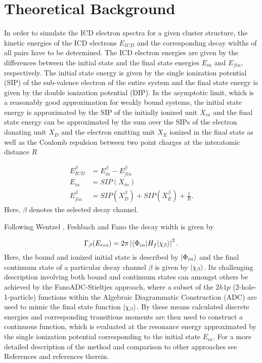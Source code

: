 \section{Theoretical Background}
\label{sec:theory}

In order to simulate the ICD electron spectra for a given cluster structure,
the kinetic energies of the ICD electrons $E_{ICD}$ and the corresponding
decay widths of all pairs have to be determined. The ICD electron energies
are given by the differences between the initial state and the final state
energies $E_{in}$ and $E_{fin}$, respectively. The initial state energy
is given by the single ionization potential (SIP) of the sub-valence electron
of the entire system
and the final state energy is given by the double ionization potential (DIP).
In the asymptotic limit, which is a reasonably good approximation for
weakly bound systems, the initial state energy is approximated by the SIP
of the initially ionized unit $X_{in}$ and the final state energy can be
approximated
by the sum over the SIPs of the electron donating unit $X_D$ and the electron
emitting unit $X_E$ ionized in the final state as well as the
Coulomb repulsion between two point charges at the interatomic distance $R$

\begin{eqnarray}
 E_{ICD}^\beta &= E_{in}^\beta - E_{fin}^\beta \label{equation:E_sec}\\
 E_{in}        &= SIP(X_{in}) \label{equation:E_in}\\          
 E_{fin}^\beta &= SIP(X_{D}^\beta) + SIP(X_{E}^\beta) + \frac 1R
           \label{equation:E_fin}                . 
\end{eqnarray}
Here, $\beta$ denotes the selected decay channel.

Following Wentzel \cite{Wentzel27}, Feshbach\cite{Feshbach58,Feshbach62}
and Fano \cite{Fano61} the decay width is given by

\begin{equation}
 \Gamma_{\beta}(E_{res}) = 2\pi \left|
                           \braket{\Phi_{in}| H_f |\chi_{\beta}}
                           \right|^2   .
\end{equation}
Here, the bound and ionized initial state is described by $\ket{\Phi_{in}}$ and
the final continuum state of a particular decay channel $\beta$ is
given by $\ket{\chi_{\beta}}$.
Its challenging description involving both bound and continuum states can
amongst others be achieved by the FanoADC-Stieltjes approach, where a
subset of the  $2h1p$ (2-hole-1-particle) functions within the
Algebraic Diagrammatic Construction
(ADC) are used to mimic the final state function $\ket{\chi_{\beta}}$.
By these means calculated discrete energies and corresponding transitions
moments are then used to construct a continuous function, which is evaluated
at the resonance energy approximated by the single ionization potential
corresponding to the initial state $E_{in}$. For a more detailed
description of the method and comparison to other approaches see References
\cite{Averbukh05,Fasshauer15_1} and references therein.
